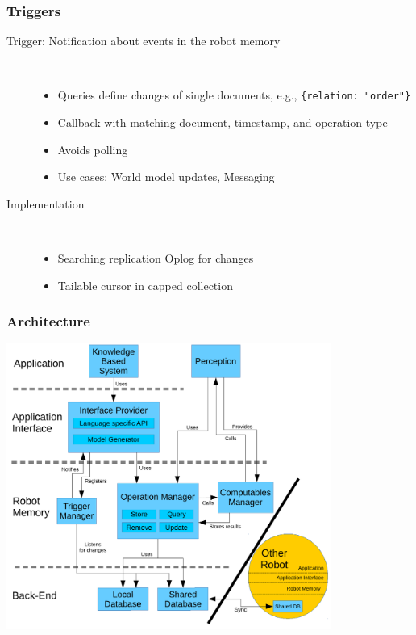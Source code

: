 \begin{frame}
  \frametitle{Triggers}
  \begin{description}
  \item[Trigger: Notification about events in the robot memory]%
                \hfill \\
    \begin{itemize}
    \item Queries define changes of single documents, e.g., \texttt{\{relation: "order"\}}
    \item Callback with matching document, timestamp, and operation type
    \item Avoids polling
    \item Use cases: World model updates, Messaging %
    \end{itemize}
  \item[Implementation]%
                \hfill \\
    \begin{itemize}
    \item Searching replication Oplog for changes
    \item Tailable cursor in capped collection %
    \end{itemize}
  \end{description}
\end{frame}

\begin{frame}
  \frametitle{Architecture}
  \center
  \includegraphics[width=0.8\textwidth]{../thesis/architecture.pdf}
\end{frame}



